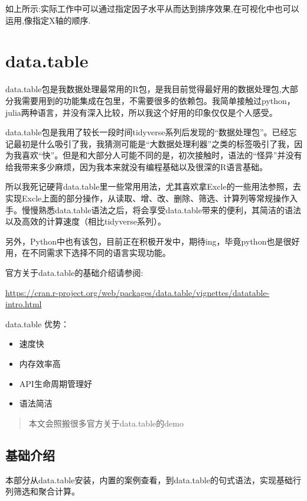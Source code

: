 \documentclass[
]{book}
\providecommand{\tightlist}{%
  \setlength{\itemsep}{0pt}\setlength{\parskip}{0pt}}
\begin{document}
如上所示:实际工作中可以通过指定因子水平从而达到排序效果,在可视化中也可以运用,像指定X轴的顺序.

\hypertarget{data.table}{%
\chapter{data.table}\label{data.table}}

data.table包是我数据处理最常用的R包，是我目前觉得最好用的数据处理包,大部分我需要用到的功能集成在包里，不需要很多的依赖包。我简单接触过python，julia两种语言，并没有深入比较，所以我这个好用的印象仅仅是个人感受。

data.table包是我用了较长一段时间tidyverse系列后发现的``数据处理包''。已经忘记最初是什么吸引了我，我猜测可能是``大数据处理利器''之类的标签吸引了我，因为我喜欢``快''。但是和大部分人可能不同的是，初次接触时，语法的``怪异''并没有给我带来多少麻烦，因为我本来就没有编程基础以及很深的R语言基础。

所以我死记硬背data.table里一些常用用法，尤其喜欢拿Excle的一些用法参照，去实现Excle上面的部分操作，从读取、增、改、删除、筛选、计算列等常规操作入手。慢慢熟悉data.table语法之后，将会享受data.table带来的便利，其简洁的语法以及高效的计算速度（相比tidyverse系列）。

另外，Python中也有该包，目前正在积极开发中，期待ing，毕竟python也是很好用，在不同需求下选择不同的语言实现功能。

官方关于data.table的基础介绍请参阅:

\url{https://cran.r-project.org/web/packages/data.table/vignettes/datatable-intro.html}

data.table 优势：

\begin{itemize}
\tightlist
\item
  速度快
\item
  内存效率高
\item
  API生命周期管理好
\item
  语法简洁
\end{itemize}

\begin{quote}
本文会照搬很多官方关于data.table的demo
\end{quote}

\hypertarget{ux57faux7840ux4ecbux7ecd}{%
\section{基础介绍}\label{ux57faux7840ux4ecbux7ecd}}

本部分从data.table安装，内置的案例查看，到data.table的句式语法，实现基础行列筛选和聚合计算。
\end{document}
